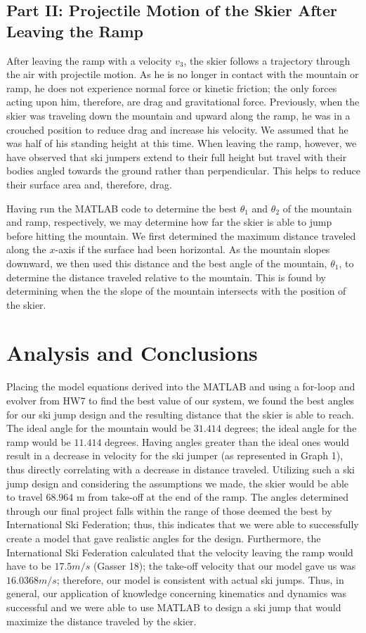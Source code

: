 \documentclass[]{IEEEphot}
\begin{document}
\subsection{Part II: Projectile Motion of the Skier After Leaving the Ramp}

After leaving the ramp with a velocity $v_3$, the skier follows a trajectory through the air with projectile motion. As he is no longer in contact with the mountain or ramp, he does not experience normal force or kinetic friction; the only forces acting upon him, therefore, are drag and gravitational force. Previously, when the skier was traveling down the mountain and upward along the ramp, he was in a crouched position to reduce drag and increase his velocity. We assumed that he was half of his standing height at this time. When leaving the ramp, however, we have observed that ski jumpers extend to their full height but travel with their bodies angled towards the ground rather than perpendicular. This helps to reduce their surface area and, therefore, drag.

Having run the MATLAB code to determine the best $\theta_1$ and $\theta_2$ of the mountain and ramp, respectively, we may determine how far the skier is able to jump before hitting the mountain. We first determined the maximum distance traveled along the $x$-axis if the surface had been horizontal. As the mountain slopes downward, we then used this distance and the best angle of the mountain, $\theta_1$, to determine the distance traveled relative to the mountain. This is found by determining when the the slope of the mountain intersects with the position of the skier.


\section{Analysis and Conclusions}

Placing the model equations derived into the MATLAB and using a for-loop and evolver from HW7 to find the best value of our system, we found the best angles for our ski jump design and the resulting distance that the skier is able to reach. The ideal angle for the mountain would be $31.414$ degrees; the ideal angle for the ramp would be $11.414$ degrees. Having angles greater than the ideal ones would result in a decrease in velocity for the ski jumper (as represented in Graph 1), thus directly correlating with a decrease in distance traveled. Utilizing such a ski jump design and considering the assumptions we made, the skier would be able to travel $68.964$ m from take-off at the end of the ramp. The angles determined through our final project falls within the range of those deemed the best by International Ski Federation; thus, this indicates that we were able to successfully create a model that gave realistic angles for the design. Furthermore, the International Ski Federation calculated that the velocity leaving the ramp would have to be $17.5 m/s$ (Gasser 18); the take-off velocity that our model gave us was $16.0368 m/s$; therefore, our model is consistent with actual ski jumps. Thus, in general, our application of knowledge concerning kinematics and dynamics was successful and we were able to use MATLAB to design a ski jump that would maximize the distance traveled by the skier.
\end{document}
